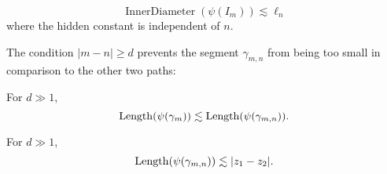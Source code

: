 \begin{lemma}
	\begin{equation*}
	\operatorname{InnerDiameter}(\psi(I_m)) \lesssim \ell_n
	\end{equation*}
	where the hidden constant is independent of $n$.
\end{lemma}

The condition $|m-n| \geq d$ prevents the segment $\gamma _{m,n}$ from being too small in comparison to the other two paths:
\begin{proposition} For $d \gg 1$, 
\begin{equation}
			\operatorname{Length}(\psi(\gamma_m)) \lesssim \operatorname{Length}(\psi(\gamma_{m,n})).
		\end{equation}
\end{proposition}



\begin{proposition} For $d \gg 1$, 
\begin{equation}
	\operatorname{Length}(\psi(\gamma_{m,n})) \lesssim |z_1-z_2|.
\end{equation}
\end{proposition}


